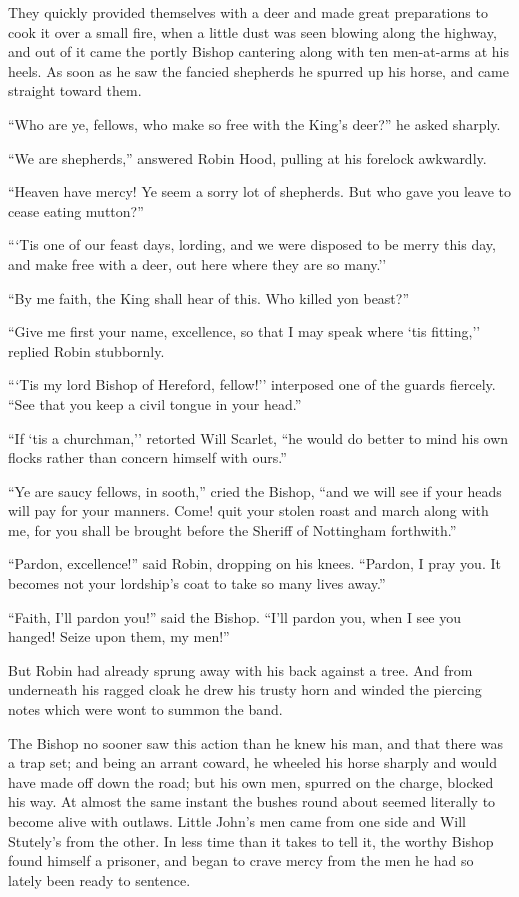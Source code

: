 They quickly provided themselves with a deer and made great preparations
to cook it over a small fire, when a little dust was seen blowing along
the highway, and out of it came the portly Bishop cantering along with
ten men-at-arms at his heels. As soon as he saw the fancied shepherds he
spurred up his horse, and came straight toward them.

``Who are ye, fellows, who make so free with the King's deer?'' he asked
sharply.

``We are shepherds,'' answered Robin Hood, pulling at his forelock
awkwardly.

``Heaven have mercy! Ye seem a sorry lot of shepherds. But who gave you
leave to cease eating mutton?''

```Tis one of our feast days, lording, and we were disposed to be merry
this day, and make free with a deer, out here where they are so many.''

``By me faith, the King shall hear of this. Who killed yon beast?''

``Give me first your name, excellence, so that I may speak where `tis
fitting,'' replied Robin stubbornly.

```Tis my lord Bishop of Hereford, fellow!'' interposed one of the
guards fiercely. ``See that you keep a civil tongue in your head.''

``If `tis a churchman,'' retorted Will Scarlet, ``he would do better to
mind his own flocks rather than concern himself with ours.''

``Ye are saucy fellows, in sooth,'' cried the Bishop, ``and we will see
if your heads will pay for your manners. Come! quit your stolen roast
and march along with me, for you shall be brought before the Sheriff of
Nottingham forthwith.''

``Pardon, excellence!'' said Robin, dropping on his knees. ``Pardon, I
pray you. It becomes not your lordship's coat to take so many lives
away.''

``Faith, I'll pardon you!'' said the Bishop. ``I'll pardon you, when I
see you hanged! Seize upon them, my men!''

But Robin had already sprung away with his back against a tree. And from
underneath his ragged cloak he drew his trusty horn and winded the
piercing notes which were wont to summon the band.

The Bishop no sooner saw this action than he knew his man, and that
there was a trap set; and being an arrant coward, he wheeled his horse
sharply and would have made off down the road; but his own men, spurred
on the charge, blocked his way. At almost the same instant the bushes
round about seemed literally to become alive with outlaws. Little John's
men came from one side and Will Stutely's from the other. In less time
than it takes to tell it, the worthy Bishop found himself a prisoner,
and began to crave mercy from the men he had so lately been ready to
sentence.

